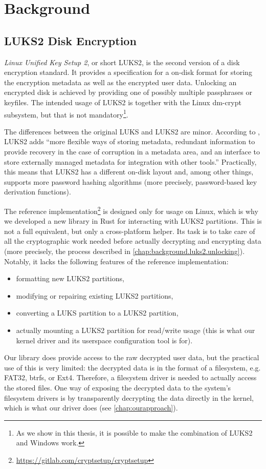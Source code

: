 \section{Background}
\label{chap:background}

\subsection{LUKS2 Disk Encryption}
\label{chap:background.luks2}
\emph{Linux Unified Key Setup 2}, or short LUKS2, is the second version of a disk encryption standard. It provides a specification \cite{Broz2018} for a on-disk format for storing the encryption metadata as well as the encrypted user data. Unlocking an encrypted disk is achieved by providing one of possibly multiple passphrases or keyfiles. The intended usage of LUKS2 is together with the Linux dm-crypt subsystem, but that is not mandatory\footnote{\label{fn:luks2windows} As we show in this thesis, it is possible to make the combination of LUKS2 and Windows work.}.

The differences between the original LUKS and LUKS2 are minor. According to \cite{Broz2018}, LUKS2 adds ``more flexible ways of storing metadata, redundant information to provide recovery in the case of corruption in a metadata area, and an interface to store externally managed metadata for integration with other tools.'' Practically, this means that LUKS2 has a different on-disk layout and, among other things, supports more password hashing algorithms (more precisely, password-based key derivation functions).

The reference implementation\footnote{\label{fn:background.luks2.referenceimpl} \url{https://gitlab.com/cryptsetup/cryptsetup}} is designed only for usage on Linux, which is why we developed a new library in Rust for interacting with LUKS2 partitions. This is not a full equivalent, but only a cross-platform helper. Its task is to take care of all the cryptographic work needed before actually decrypting and encrypting data (more precisely, the process described in \autoref{chap:background.luks2.unlocking}). Notably, it lacks the following features of the reference implementation:
\begin{itemize}[label=\textbf{--}]
	\item formatting new LUKS2 partitions,
	\item modifying or repairing existing LUKS2 partitions,
	\item converting a LUKS partition to a LUKS2 partition,
	\item actually mounting a LUKS2 partition for read/write usage (this is what our kernel driver and its userspace configuration tool is for).
\end{itemize}
Our library does provide access to the raw decrypted user data, but the practical use of this is very limited: the decrypted data is in the format of a filesystem, e.g. FAT32, btrfs, or Ext4. Therefore, a filesystem driver is needed to actually access the stored files. One way of exposing the decrypted data to the system's filesystem drivers is by transparently decrypting the data directly in the kernel, which is what our driver does (see \autoref{chap:ourapproach}).

